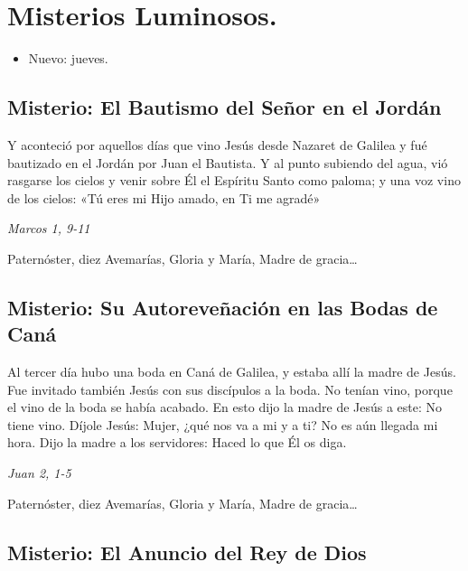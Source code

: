 \documentclass[./rosary.tex]{subfiles}
\newcounter{lux-counter}
\begin{document}
\section*{Misterios Luminosos.}
\begin{itemize}
      \item Nuevo: jueves.
\end{itemize}

\subsection*{ Misterio: El Bautismo del Señor en el Jordán}

Y aconteció por aquellos días que vino Jesús desde Nazaret de Galilea y fué bautizado en el Jordán por Juan el Bautista. Y al punto subiendo del agua, vió rasgarse los cielos y venir sobre Él el Espíritu Santo como paloma; y una voz vino de los cielos: «Tú eres mi Hijo amado, en Ti me agradé»

\begin{flushright}
      \emph{Marcos 1, 9-11}
\end{flushright}

Paternóster, diez Avemarías, Gloria y María, Madre de gracia{\ldots}

\bigskip

\subsection*{ Misterio: Su Autoreveñación en las Bodas de Caná}

Al tercer día hubo una boda en Caná de Galilea, y estaba allí la madre de Jesús. Fue invitado también Jesús con sus discípulos a la boda. No tenían vino, porque el vino de la boda se había acabado. En esto dijo la madre de Jesús a este: No tiene vino. Díjole Jesús: Mujer, ¿qué nos va a mi y a ti? No es aún llegada mi hora. Dijo la madre a los servidores: Haced lo que Él os diga.

\begin{flushright}
      \emph{Juan 2, 1-5}
\end{flushright}

Paternóster, diez Avemarías, Gloria y María, Madre de gracia{\ldots}

\bigskip

\subsection*{ Misterio: El Anuncio del Rey de Dios}
\end{document}
